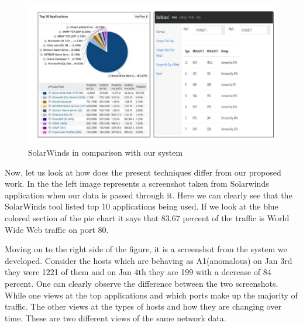 \begin{figure}[b]
	\centerline{\includegraphics[scale = 0.5]{intro.pdf}}
	\caption{SolarWinds in comparison with our system}%
\end{figure}

Now, let us look at how does the present techniques differ from our proposed work. In the  the left image represents a screenshot taken from Solarwinds application when our data is passed through it. Here we can clearly see that the SolarWinds tool listed top 10 applications being used. If we look at the blue colored section of the pie chart it says that 83.67 percent of the traffic is World Wide Web traffic on port 80. 

Moving on to the right side of the figure, it is a screenshot from the system we developed. Consider the hosts which are behaving as A1(anomalous) on Jan 3rd they were 1221 of them and on Jan 4th they are 199 with a decrease of 84 percent. One can clearly observe the difference between the two screenshots. While one views at the top applications and which ports make up the majority of traffic. The other views at the types of hosts and how they are changing over time. These are two different views of the same network data.

